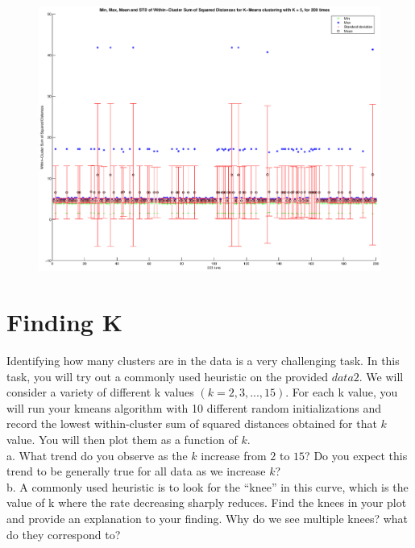 \documentclass{article} %
\begin{document}
\begin{figure}[h]
\begin{center}
\includegraphics[width=16cm]{Fig/fig_Within_cluster_sum_of_squared_distances_200runs.eps}
 \end{center}
\label{fig:fig_Within_cluster_sum_of_squared_distances_200runs}
\end{figure}

\section{Finding K }
Identifying how many clusters are in the data is a very challenging task. In this task, you will try out a commonly used heuristic on the provided $data2$. We will consider a variety of different k values $\left(k = 2, 3, ..., 15\right)$. For each k value, you will run your kmeans algorithm with 10 different random initializations and record the lowest within-cluster sum of squared distances obtained for that $k$ value. You will then plot them as a function of $k$.\\
a. What trend do you observe as the $k$ increase from $2$ to $15$? Do you expect this trend to be generally true for all data as we increase $k$?\\
b. A commonly used heuristic is to look for the “knee” in this curve, which is the value of k where the rate decreasing sharply reduces. Find the knees in your plot and provide an explanation to your finding. Why do we see multiple knees? what do they correspond to?\\
\end{document}
